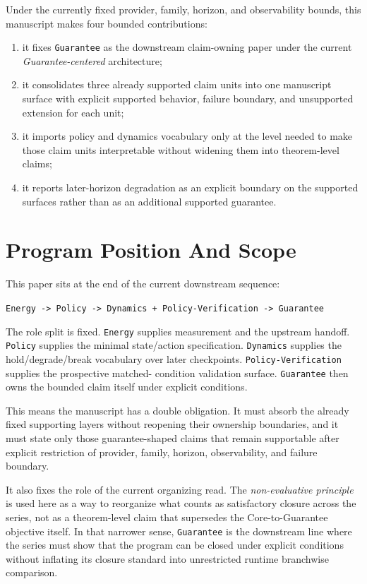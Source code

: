 \documentclass[11pt]{article}
\begin{document}
Under the currently fixed provider, family, horizon, and observability bounds,
this manuscript makes four bounded contributions:

\begin{enumerate}
\item it fixes \texttt{Guarantee} as the downstream claim-owning paper under the
current \textit{Guarantee-centered} architecture;
\item it consolidates three already supported claim units into one manuscript
surface with explicit supported behavior, failure boundary, and unsupported
extension for each unit;
\item it imports policy and dynamics vocabulary only at the level needed to make
those claim units interpretable without widening them into theorem-level claims;
\item it reports later-horizon degradation as an explicit boundary on the
supported surfaces rather than as an additional supported guarantee.
\end{enumerate}

\section{Program Position And Scope}

This paper sits at the end of the current downstream sequence:

\begin{center}
\texttt{Energy -> Policy -> Dynamics + Policy-Verification -> Guarantee}
\end{center}

\noindent The role split is fixed. \texttt{Energy} supplies measurement and the
upstream handoff. \texttt{Policy} supplies the minimal state/action
specification. \texttt{Dynamics} supplies the hold/degrade/break vocabulary over
later checkpoints. \texttt{Policy-Verification} supplies the prospective matched-
condition validation surface. \texttt{Guarantee} then owns the bounded claim
itself under explicit conditions.

This means the manuscript has a double obligation. It must absorb the already
fixed supporting layers without reopening their ownership boundaries, and it must
state only those guarantee-shaped claims that remain supportable after explicit
restriction of provider, family, horizon, observability, and failure boundary.

It also fixes the role of the current organizing read. The
\textit{non-evaluative principle} is used here as a way to reorganize what
counts as satisfactory closure across the series, not as a theorem-level claim
that supersedes the Core-to-Guarantee objective itself. In that narrower sense,
\texttt{Guarantee} is the downstream line where the series must show that the
program can be closed under explicit conditions without inflating its closure
standard into unrestricted runtime branchwise comparison.
\end{document}
